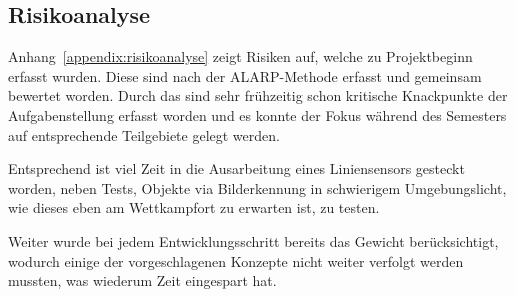 \documentclass[main.tex]{subfiles} %
\begin{document}

\subsection{Risikoanalyse}

Anhang~\ref{appendix:risikoanalyse} zeigt Risiken auf, welche zu Projektbeginn
erfasst wurden. Diese sind nach der ALARP-Methode erfasst und gemeinsam
bewertet worden. Durch das sind sehr frühzeitig schon kritische Knackpunkte der
Aufgabenstellung erfasst worden und es konnte der Fokus während des Semesters
auf entsprechende Teilgebiete gelegt werden.

Entsprechend ist viel Zeit in die Ausarbeitung eines Liniensensors gesteckt
worden, neben Tests, Objekte via Bilderkennung in schwierigem Umgebungslicht,
wie dieses eben am Wettkampfort zu erwarten ist, zu testen.

Weiter wurde bei jedem Entwicklungsschritt bereits das Gewicht berücksichtigt,
wodurch einige der vorgeschlagenen Konzepte nicht weiter verfolgt werden
mussten, was wiederum Zeit eingespart hat.
\end{document}
